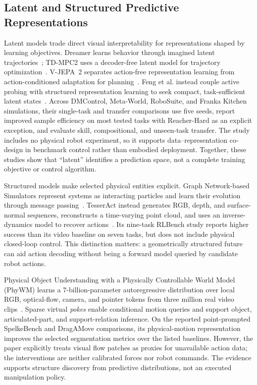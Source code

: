 \subsection{Latent and Structured Predictive Representations}
Latent models trade direct visual interpretability for representations shaped by learning objectives. Dreamer learns behavior through imagined latent trajectories~\cite{hafner2020dreamer}; TD-MPC2 uses a decoder-free latent model for trajectory optimization~\cite{hansen2024tdmpc2}. V-JEPA~2 separates action-free representation learning from action-conditioned adaptation for planning~\cite{assran2025vjepa2}. Feng et al. instead couple active probing with structured representation learning to seek compact, task-sufficient latent states~\cite{feng2026tasksufficient}. Across DMControl, Meta-World, RoboSuite, and Franka Kitchen simulations, their single-task and transfer comparisons use five seeds, report improved sample efficiency on most tested tasks with Reacher-Hard as an explicit exception, and evaluate skill, compositional, and unseen-task transfer. The study includes no physical robot experiment, so it supports data--representation co-design in benchmark control rather than embodied deployment. Together, these studies show that ``latent'' identifies a prediction space, not a complete training objective or control algorithm.

Structured models make selected physical entities explicit. Graph Network-based Simulators represent systems as interacting particles and learn their evolution through message passing~\cite{sanchez2020gns}. TesserAct instead generates RGB, depth, and surface-normal sequences, reconstructs a time-varying point cloud, and uses an inverse-dynamics model to recover actions~\cite{zhen2025tesseract}. Its nine-task RLBench study reports higher success than its video baseline on seven tasks, but does not include physical closed-loop control. This distinction matters: a geometrically structured future can aid action decoding without being a forward model queried by candidate robot actions.

Physical Object Understanding with a Physically Controllable World Model (PhyWM) learns a 7-billion-parameter autoregressive distribution over local RGB, optical-flow, camera, and pointer tokens from three million real video clips~\cite{venkatesh2026phywm}. Sparse virtual \emph{pokes} enable conditional motion queries and support object, articulated-part, and support-relation inference. On the reported point-prompted SpelkeBench and DragAMove comparisons, its physical-motion representation improves the selected segmentation metrics over the listed baselines. However, the paper explicitly treats visual flow patches as proxies for unavailable action data; the interventions are neither calibrated forces nor robot commands. The evidence supports structure discovery from predictive distributions, not an executed manipulation policy.

